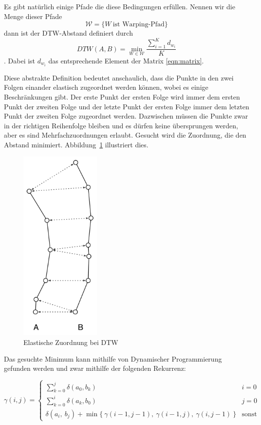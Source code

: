 Es gibt natürlich einige Pfade die diese Bedingungen erfüllen. Nennen wir die Menge dieser Pfade
\[ \mathcal{W}=\{W~\text{ist Warping-Pfad}\} \]
dann ist der DTW-Abstand definiert durch
\begin{equation}
  \label{eqn:dtw}
  DTW(A,B) = \min_{W \in \mathcal{W}}{\frac{\sum_{i=1}^K d_{w_i}}{K}}
\end{equation}
. Dabei ist \( d_{w_i} \) das entsprechende Element der Matrix \ref{eqn:matrix}.

Diese abstrakte Definition bedeutet anschaulich, dass die Punkte in den zwei Folgen einander elastisch zugeordnet werden können, wobei es einige Beschränkungen gibt. Der erste Punkt der ersten Folge wird immer dem ersten Punkt der zweiten Folge und der letzte Punkt der ersten Folge immer dem letzten Punkt der zweiten Folge zugeordnet werden. Dazwischen müssen die Punkte zwar in der richtigen Reihenfolge bleiben und es dürfen keine übersprungen werden, aber es sind Mehrfachzuordnungen erlaubt. Gesucht wird die Zuordnung, die den Abstand minimiert. Abbildung~\ref{fig:dtw} illustriert dies.

\begin{figure}
  \centering \includegraphics[width=4cm]{figures/dtw.png}
  \caption{Elastische Zuordnung bei DTW}
  \label{fig:dtw}
\end{figure}

Das gesuchte Minimum kann mithilfe von Dynamischer Programmierung \cite[S.323ff.]{algorithms} gefunden werden und zwar mithilfe der folgenden Rekurrenz:

\begin{equation}
  \label{eqn:dp}
  \gamma(i,j) =
  \begin{cases}
    \sum_{k=0}^j \delta(a_0, b_k) & i = 0 \\
    \sum_{k=0}^i \delta(a_k, b_0) & j = 0 \\
    \delta(a_i,~b_j) + \min\{~\gamma(i-1,j-1),~\gamma(i-1,j),~\gamma(i,j-1)~\} & \text{sonst}
  \end{cases}
\end{equation}

